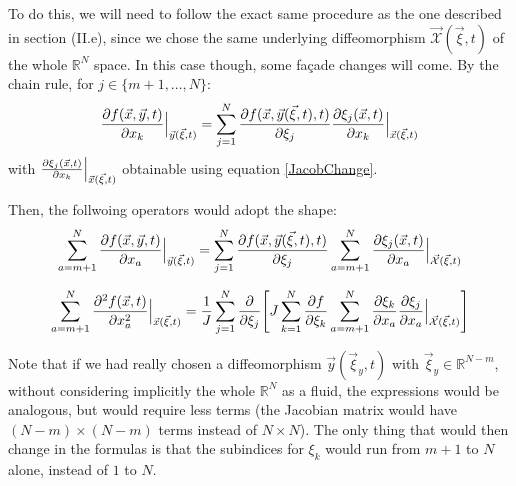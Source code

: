 \documentclass[11pt, a4paper]{article} %
\newcommand{\R}{\mathbb{R}} %
\newcommand{\x}{\mathcal{X}}
\begin{document}
To do this, we will need to follow the exact same procedure as the one described in section (II.e), since we chose the same underlying diffeomorphism $\vec{\x}(\vec{\xi},t)$ of the whole $\R^N$ space. In this case though, some façade changes will come. By the chain rule, for $j\in\{m+1,...,N \}$:
\begin{equation}
\pdv{f(\vec{x}, \vec{y},t)}{x_k}\Big\rvert_{\vec{y}(\vec{\xi},t)}=\sum_{j=1}^N \pdv{f(\vec{x},\vec{y}(\vec{\xi},t),t)}{\xi_j} \pdv{\xi_j(\vec{x},t)}{x_k}\Big\rvert_{\vec{x}(\vec{\xi},t)}
\end{equation}
with $\pdv{\xi_j(\vec{x},t)}{x_k}\Big\rvert_{\vec{x}(\vec{\xi},t)}$ obtainable using equation \eqref{JacobChange}.

Then, the follwoing operators would adopt the shape:
\begin{equation}
\sum_{a=m+1}^N \pdv{f(\vec{x}, \vec{y},t)}{x_a}\Big\rvert_{\vec{y}(\vec{\xi},t)} = \sum_{j=1}^N \pdv{f(\vec{x}, \vec{y}(\vec{\xi},t),t)}{\xi_j} \sum_{a=m+1}^N \pdv{\xi_j(\vec{x},t)}{x_a}\Big\rvert_{\vec{\x}(\vec{\xi},t)}
\end{equation}

\begin{equation}
\sum_{a=m+1}^N \pdv[2]{f(\vec{x},t)}{x_a}\Big\rvert_{\vec{x}(\vec{\xi},t)}=\frac{1}{J} \sum_{j=1}^N\pdv{}{\xi_j} \qty[ J\sum_{k=1}^N\pdv{f}{\xi_k}\sum_{a=m+1}^N\pdv{\xi_k}{x_a}\pdv{\xi_j}{x_a}\Big\rvert_{\vec{\x}(\vec{\xi},t)}]
\end{equation}


Note that if we had really chosen a diffeomorphism $\vec{y}(\vec{\xi}_y,t)$ with $\vec{\xi}_y\in\R^{N-m}$, without considering implicitly the whole $\R^N$ as a fluid, the expressions would be analogous, but would require less terms (the Jacobian matrix would have $(N-m)\times (N-m)$ terms instead of $N\times N$). The only thing that would then change in the formulas is that the subindices for $\xi_k$ would run from $m+1$ to $N$ alone, instead of $1$ to $N$. 
\end{document}
